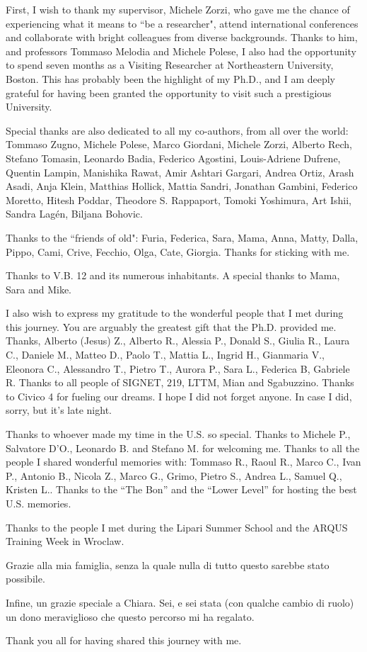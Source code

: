\clearpairofpagestyles
\rohead*{}
\rehead*{}
\lohead*{}
\lehead*{}
\rofoot{}
\lefoot{}

\small

First, I wish to thank my supervisor, Michele Zorzi, who gave me the chance of experiencing what it means to ``be a researcher", attend international conferences and collaborate with bright colleagues from diverse backgrounds.
Thanks to him, and professors Tommaso Melodia and Michele Polese, I also had the opportunity to spend seven
months as a Visiting Researcher at Northeastern University, Boston. This has probably been the highlight of my Ph.D., and I am deeply grateful for having been granted the opportunity to visit such a prestigious University.

Special thanks are also dedicated to all my co-authors, from all over the world:
Tommaso Zugno, Michele Polese, Marco Giordani, Michele Zorzi,
Alberto Rech, Stefano Tomasin, Leonardo Badia, Federico Agostini, Louis-Adriene Dufrene, Quentin Lampin, Manishika Rawat,
Amir Ashtari Gargari, Andrea Ortiz, Arash Asadi, Anja Klein, Matthias Hollick,
Mattia Sandri,
Jonathan Gambini, Federico Moretto,
Hitesh Poddar, Theodore S. Rappaport, Tomoki Yoshimura, Art Ishii,
Sandra Lagén, Biljana Bohovic.

Thanks to the ``friends of old": Furia, Federica, Sara, Mama, Anna, Matty, Dalla, Pippo, Cami, Crive, Fecchio, Olga, Cate, Giorgia. Thanks for sticking with me.

Thanks to V.B. 12 and its numerous inhabitants. A special thanks to Mama, Sara and Mike.

I also wish to express my gratitude to the wonderful people that I met during this journey.
You are arguably the greatest gift that the Ph.D. provided me. 
Thanks, Alberto (Jesus) Z., Alberto R., Alessia P., Donald S., Giulia R., Laura C., Daniele M., Matteo D., Paolo T., Mattia L., Ingrid H., Gianmaria V., Eleonora C., Alessandro T., Pietro T., Aurora P., Sara L., Federica B, Gabriele R.
Thanks to all people of SIGNET, 219, LTTM, Mian and Sgabuzzino.
Thanks to Civico 4 for fueling our dreams.
I hope I did not forget anyone. In case I did, sorry, but it's late night.

Thanks to whoever made my time in the U.S. so special. Thanks to Michele P., Salvatore D'O., Leonardo B. and Stefano M. for welcoming me.
Thanks to all the people I shared wonderful memories with: Tommaso R., Raoul R., Marco C., Ivan P., Antonio B., Nicola Z., Marco G., Grimo, Pietro S., Andrea L., Samuel Q., Kristen L..
Thanks to the ``The Bon'' and the ``Lower Level'' for hosting the best U.S. memories.

Thanks to the people I met during the Lipari Summer School and the ARQUS Training Week in Wroclaw.

Grazie alla mia famiglia, senza la quale nulla di tutto questo sarebbe stato possibile.

Infine, un grazie speciale a Chiara. Sei, e sei stata (con qualche cambio di ruolo) un dono meraviglioso che questo percorso mi ha regalato.

\normalsize
Thank you all for having shared this journey with me.